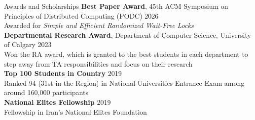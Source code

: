\documentclass{resume} %
\begin{document}


\begin{rSection}{Awards and Scholarships}
{\bf Best Paper Award}{, 45th ACM Symposium on Principles of Distributed Computing (PODC)} \hfill{2026}
\\Awarded for \textit{Simple and Efficient Randomized Wait-Free Locks}\\
{\bf Departmental Research Award}{, Department of Computer Science, University of Calgary} \hfill{2023}
\\Won the RA award, which is granted to the best students in each department to step away from TA responsibilities and focus on their research\\
{\bf Top 100 Students in Country}{} \hfill{2019}
\\Ranked 94 (31st in the Region) in National Universities Entrance Exam among around 160,000 participants\\
{\bf National Elites Fellowship}{} \hfill{2019}
\\Fellowship in Iran's National Elites Foundation\\
\end{rSection}


\end{document}
